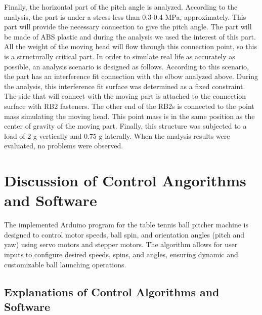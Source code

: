 \documentclass[12pt]{article}
\begin{document}
Finally, the horizontal part of the pitch angle is analyzed. According to the analysis, the part is under a stress less than 0.3-0.4 MPa, approximately. 
This part will provide the necessary connection to give the pitch angle. The part will be made of ABS plastic and during the analysis we used the interest of this part. All the weight of the moving head will flow through this connection point, so this is a structurally critical part. In order to simulate real life as accurately as possible, an analysis scenario is designed as follows. According to this scenario, the part has an interference fit connection with the elbow analyzed above. During the analysis, this interference fit surface was determined as a fixed constraint. The side that will connect with the moving part is attached to the connection surface with RB2 fasteners. The other end of the RB2s is connected to the point mass simulating the moving head. This point mass is in the same position as the center of gravity of the moving part. Finally, this structure was subjected to a load of 2 g vertically and 0.75 g laterally. When the analysis results were evaluated, no problems were observed.

\section{Discussion of Control Angorithms and Software}

The implemented Arduino program for the table tennis ball pitcher machine is designed to control motor speeds, ball spin, and orientation angles (pitch and yaw) using servo motors and stepper motors. The algorithm allows for user inputs to configure desired speeds, spins, and angles, ensuring dynamic and customizable ball launching operations.

\subsection{Explanations of Control Algorithms and Software}
\end{document}
